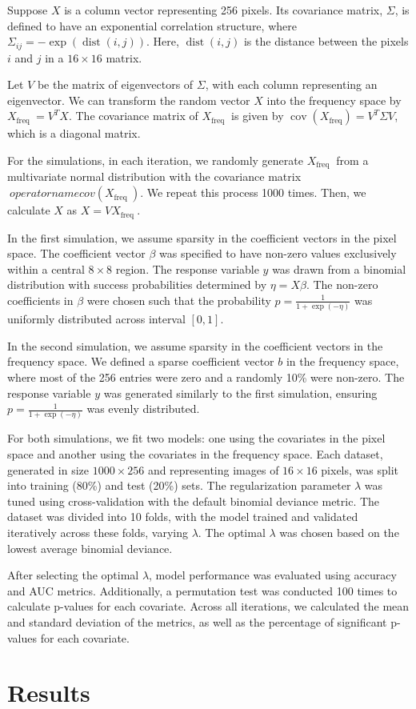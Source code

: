 \documentclass[12pt]{article}
\begin{document}
Suppose \( X \) is a column vector representing 256 pixels. Its covariance matrix, \( \Sigma \), is defined to have an exponential correlation structure, where \( \Sigma_{i j}=-\exp (\operatorname{dist}(i, j)) \). Here, \( \operatorname{dist}(i, j) \) is the distance between the pixels \( i \) and \( j \) in a \( 16 \times 16 \) matrix.

Let \( V \) be the matrix of eigenvectors of \( \Sigma \), with each column representing an eigenvector. We can transform the random vector \( X \) into the frequency space by \( X_{\text {freq }}=V^T X \). The covariance matrix of \( X_{\text {freq }} \) is given by \( \operatorname{cov}\left(X_{\mathrm{freq}}\right)=V^T \Sigma V \), which is a diagonal matrix.

For the simulations, in each iteration, we randomly generate \( X_{\text {freq }} \) from a multivariate normal distribution with the covariance matrix \(\ operatorname{cov}\left(X_{\text {freq }}\right) \). We repeat this process 1000 times. Then, we calculate \( X \) as \( X=V X_{\text {freq }} \).

In the first simulation, we assume sparsity in the coefficient vectors in the pixel space. The coefficient vector \( \beta \) was specified to have non-zero values exclusively within a central \( 8 \times 8 \) region. The response variable \( y \) was drawn from a binomial distribution with success probabilities determined by \( \eta = X \beta \). The non-zero coefficients in \( \beta \) were chosen such that the probability \( p = \frac{1}{1 + \exp(-\eta)} \) was uniformly distributed across interval \( [0, 1] \).

In the second simulation, we assume sparsity in the coefficient vectors in the frequency space. We defined a sparse coefficient vector \( b \) in the frequency space, where most of the 256 entries were zero and a randomly 10\% were non-zero. The response variable \( y \) was generated similarly to the first simulation, ensuring \( p = \frac{1}{1 + \exp(-\eta)} \) was evenly distributed.

For both simulations, we fit two models: one using the covariates in the pixel space and another using the covariates in the frequency space. Each dataset, generated in size \( 1000 \times 256 \) and representing images of \( 16 \times 16 \) pixels, was split into training (80\%) and test (20\%) sets. The regularization parameter \( \lambda \) was tuned using cross-validation with the default binomial deviance metric. The dataset was divided into 10 folds, with the model trained and validated iteratively across these folds, varying \( \lambda \). The optimal \( \lambda \) was chosen based on the lowest average binomial deviance.

After selecting the optimal \( \lambda \), model performance was evaluated using accuracy and AUC metrics. Additionally, a permutation test was conducted 100 times to calculate p-values for each covariate. Across all iterations, we calculated the mean and standard deviation of the metrics, as well as the percentage of significant p-values for each covariate.

\section*{Results}
\end{document}
